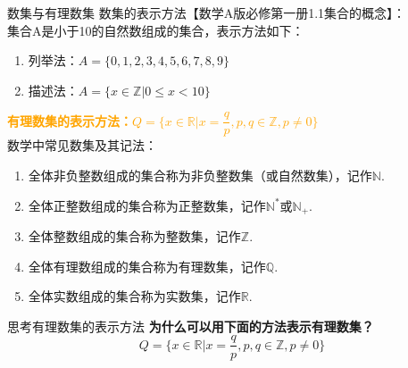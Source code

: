\documentclass[aspectratio=169]{ctexbeamer} %
\begin{document}


\begin{frame}{数集与有理数集}
数集的表示方法【数学A版必修第一册1.1集合的概念】：\\
集合A是小于10的自然数组成的集合，表示方法如下：\\
\begin{enumerate}[label={\arabic*.}]
\item 列举法：$A = \{0, 1, 2, 3, 4, 5, 6, 7, 8, 9\}$
\item 描述法：$A = \{x \in \mathbb{Z} | 0 \leq x < 10\}$
\end{enumerate}
\textbf{\textcolor{orange}{有理数集的表示方法：$Q = \{ x \in \mathbb{R} | x = \dfrac{q}{p}, p,q \in \mathbb{Z}, p \neq 0\} $ }}\\
数学中常见数集及其记法：
\begin{enumerate}[itemsep=6pt,label={\arabic*.}]
\item 全体非负整数组成的集合称为非负整数集（或自然数集），记作$\mathbb{N}$.
\item 全体正整数组成的集合称为正整数集，记作$\mathbb{N}^*$或$\mathbb{N}_+$.
\item 全体整数组成的集合称为整数集，记作$\mathbb{Z}$.
\item 全体有理数组成的集合称为有理数集，记作$\mathbb{Q}$.
\item 全体实数组成的集合称为实数集，记作$\mathbb{R}$.
\end{enumerate}

\end{frame}

\begin{frame}[t]{思考有理数集的表示方法}
\textbf{为什么可以用下面的方法表示有理数集？ }\\
\vspace{36pt}
$$Q = \{ x \in \mathbb{R} | x = \dfrac{q}{p}, p,q \in \mathbb{Z}, p \neq 0\} $$
\vspace{5cm}

\end{frame}
\end{document}
